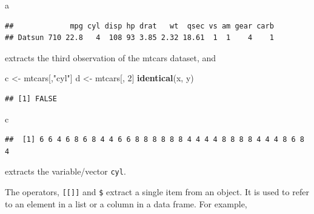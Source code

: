 \documentclass[
  12pt,
  oneside]{book}
\newenvironment{Shaded}{\begin{snugshade}}{\end{snugshade}}
\newcommand{\DecValTok}[1]{\textcolor[rgb]{0.00,0.00,0.81}{#1}}
\newcommand{\FunctionTok}[1]{\textcolor[rgb]{0.13,0.29,0.53}{\textbf{#1}}}
\newcommand{\NormalTok}[1]{#1}
\newcommand{\OtherTok}[1]{\textcolor[rgb]{0.56,0.35,0.01}{#1}}
\newcommand{\SpecialCharTok}[1]{\textcolor[rgb]{0.81,0.36,0.00}{\textbf{#1}}}
\newcommand{\StringTok}[1]{\textcolor[rgb]{0.31,0.60,0.02}{#1}}
\theoremstyle{definition}
\theoremstyle{definition}
\theoremstyle{definition}
\theoremstyle{definition}
\theoremstyle{remark}
\begin{document}
\begin{Shaded}
\begin{Highlighting}[]
\NormalTok{a}
\end{Highlighting}
\end{Shaded}

\begin{verbatim}
##             mpg cyl disp hp drat   wt  qsec vs am gear carb
## Datsun 710 22.8   4  108 93 3.85 2.32 18.61  1  1    4    1
\end{verbatim}

extracts the third observation of the mtcars dataset, and

\begin{Shaded}
\begin{Highlighting}[]
\NormalTok{c }\OtherTok{\textless{}{-}}\NormalTok{ mtcars[,}\StringTok{"cyl"}\NormalTok{]}
\NormalTok{d }\OtherTok{\textless{}{-}}\NormalTok{ mtcars[, }\DecValTok{2}\NormalTok{]}
\FunctionTok{identical}\NormalTok{(x, y)}
\end{Highlighting}
\end{Shaded}

\begin{verbatim}
## [1] FALSE
\end{verbatim}

\begin{Shaded}
\begin{Highlighting}[]
\NormalTok{c}
\end{Highlighting}
\end{Shaded}

\begin{verbatim}
##  [1] 6 6 4 6 8 6 8 4 4 6 6 8 8 8 8 8 8 4 4 4 4 8 8 8 8 4 4 4 8 6 8 4
\end{verbatim}

extracts the variable/vector \texttt{cyl}.

The operators, \texttt{{[}{[}{]}{]}} and \texttt{\$} extract a single item from an object. It is used to refer to an element in a list or a column in a data frame. For example,

\begin{Shaded}
\end{Shaded}
\end{document}
